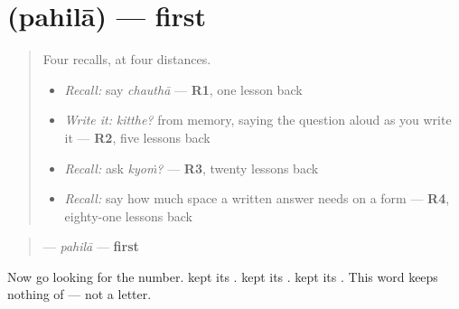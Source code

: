 \section[\texorpdfstring{\pa{ਪਹਿਲਾ} (pahilā)}{ਪਹਿਲਾ (pahilā)}]{ (pahilā) — first}

\label{lesson:PA-C44-pahila}



\begin{quote}
Four recalls, at four distances.

\begin{itemize}
\raggedright
  \item \emph{Recall:} say \emph{chauthā} — \textbf{R1}, one lesson back
  \item \emph{Write it:} \emph{kitthe?} from memory, saying the question aloud as you write it — \textbf{R2}, five lessons back
  \item \emph{Recall:} ask \emph{kyoṁ?} — \textbf{R3}, twenty lessons back
  \item \emph{Recall:} say how much space a written answer needs on a form — \textbf{R4}, eighty-one lessons back
\end{itemize}
\end{quote}

\begin{cousinweb}
\begin{quote}
\textbf{} — \emph{pahilā} — \textbf{first}
\end{quote}

Now go looking for the number. \textbf{} kept its \textbf{}. \textbf{} kept its \textbf{}. \textbf{} kept its \textbf{}. This word keeps nothing of \textbf{} — not a letter.
\end{cousinweb}

